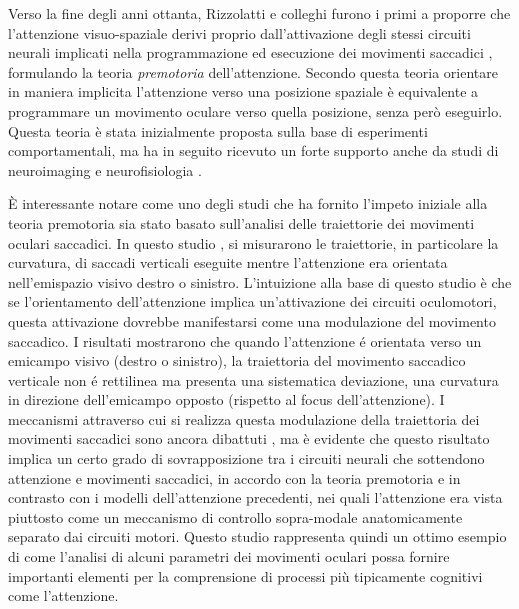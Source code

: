 \documentclass[12pt]{article}
\begin{document}
Verso la fine degli anni ottanta, Rizzolatti e colleghi furono i primi a proporre che l'attenzione visuo-spaziale derivi proprio dall'attivazione degli stessi circuiti neurali implicati nella programmazione ed esecuzione dei movimenti saccadici \cite{Rizzolatti1987}, formulando la teoria \textit{premotoria} dell'attenzione. Secondo questa teoria orientare in maniera implicita l'attenzione verso una posizione spaziale è equivalente a programmare un movimento oculare verso quella posizione, senza però eseguirlo. Questa teoria è stata inizialmente proposta sulla base di esperimenti comportamentali, ma ha in seguito ricevuto un forte supporto anche da studi di neuroimaging \cite{Corbetta1998} e neurofisiologia \cite{Moore2001}. 

È interessante notare come uno degli studi che ha fornito l'impeto iniziale alla teoria premotoria sia stato basato sull'analisi delle traiettorie dei movimenti oculari saccadici. In questo studio \cite{Sheliga1995}, si misurarono le traiettorie, in particolare la curvatura, di saccadi verticali eseguite mentre l'attenzione era orientata nell'emispazio visivo destro o sinistro. L'intuizione alla base di questo studio è che se l'orientamento dell'attenzione implica un'attivazione dei circuiti oculomotori, questa attivazione dovrebbe manifestarsi come una modulazione del movimento saccadico. I risultati mostrarono che quando l'attenzione é orientata verso un emicampo visivo (destro o sinistro), la traiettoria del movimento saccadico verticale non é rettilinea ma presenta una sistematica deviazione, una curvatura in direzione dell'emicampo opposto (rispetto al focus dell'attenzione). I meccanismi attraverso cui si realizza questa modulazione della traiettoria dei movimenti saccadici sono ancora dibattuti \cite{VanderStigchel2006}, ma è evidente che questo risultato implica un certo grado di sovrapposizione tra i circuiti neurali che sottendono attenzione e movimenti saccadici, in accordo con la teoria premotoria e in contrasto con i modelli dell'attenzione precedenti, nei quali l'attenzione era vista piuttosto come un meccanismo di controllo sopra-modale anatomicamente separato dai circuiti motori. Questo studio rappresenta quindi un ottimo esempio di come l'analisi di alcuni parametri dei movimenti oculari possa fornire importanti elementi per la comprensione di processi più tipicamente cognitivi come l'attenzione.
\end{document}
